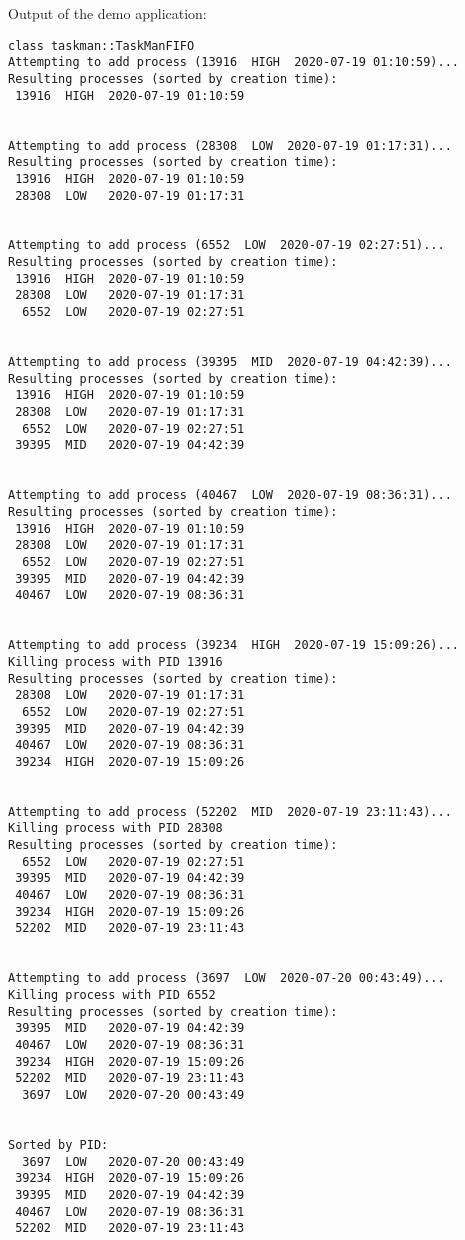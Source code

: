 \documentclass[a4paper]{scrartcl}
\begin{document}
Output of the demo application:
\begin{verbatim}
class taskman::TaskManFIFO
Attempting to add process (13916  HIGH  2020-07-19 01:10:59)...
Resulting processes (sorted by creation time):
 13916  HIGH  2020-07-19 01:10:59


Attempting to add process (28308  LOW  2020-07-19 01:17:31)...
Resulting processes (sorted by creation time):
 13916  HIGH  2020-07-19 01:10:59
 28308  LOW   2020-07-19 01:17:31


Attempting to add process (6552  LOW  2020-07-19 02:27:51)...
Resulting processes (sorted by creation time):
 13916  HIGH  2020-07-19 01:10:59
 28308  LOW   2020-07-19 01:17:31
  6552  LOW   2020-07-19 02:27:51


Attempting to add process (39395  MID  2020-07-19 04:42:39)...
Resulting processes (sorted by creation time):
 13916  HIGH  2020-07-19 01:10:59
 28308  LOW   2020-07-19 01:17:31
  6552  LOW   2020-07-19 02:27:51
 39395  MID   2020-07-19 04:42:39


Attempting to add process (40467  LOW  2020-07-19 08:36:31)...
Resulting processes (sorted by creation time):
 13916  HIGH  2020-07-19 01:10:59
 28308  LOW   2020-07-19 01:17:31
  6552  LOW   2020-07-19 02:27:51
 39395  MID   2020-07-19 04:42:39
 40467  LOW   2020-07-19 08:36:31


Attempting to add process (39234  HIGH  2020-07-19 15:09:26)...
Killing process with PID 13916
Resulting processes (sorted by creation time):
 28308  LOW   2020-07-19 01:17:31
  6552  LOW   2020-07-19 02:27:51
 39395  MID   2020-07-19 04:42:39
 40467  LOW   2020-07-19 08:36:31
 39234  HIGH  2020-07-19 15:09:26


Attempting to add process (52202  MID  2020-07-19 23:11:43)...
Killing process with PID 28308
Resulting processes (sorted by creation time):
  6552  LOW   2020-07-19 02:27:51
 39395  MID   2020-07-19 04:42:39
 40467  LOW   2020-07-19 08:36:31
 39234  HIGH  2020-07-19 15:09:26
 52202  MID   2020-07-19 23:11:43


Attempting to add process (3697  LOW  2020-07-20 00:43:49)...
Killing process with PID 6552
Resulting processes (sorted by creation time):
 39395  MID   2020-07-19 04:42:39
 40467  LOW   2020-07-19 08:36:31
 39234  HIGH  2020-07-19 15:09:26
 52202  MID   2020-07-19 23:11:43
  3697  LOW   2020-07-20 00:43:49


Sorted by PID:
  3697  LOW   2020-07-20 00:43:49
 39234  HIGH  2020-07-19 15:09:26
 39395  MID   2020-07-19 04:42:39
 40467  LOW   2020-07-19 08:36:31
 52202  MID   2020-07-19 23:11:43



\end{verbatim}
\end{document}
